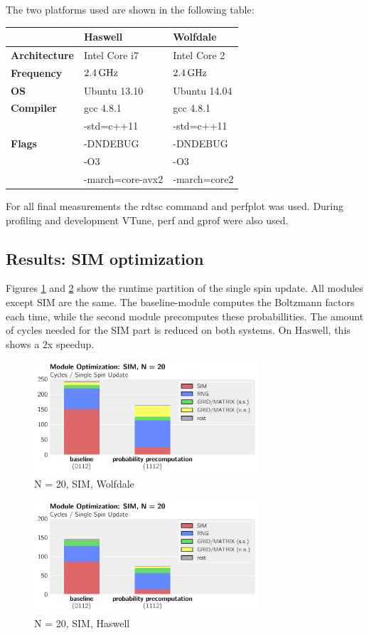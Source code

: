 \documentclass[letterpaper]{article}
\begin{document}
The two platforms used are shown in the following table:\newline
\begin{table}[h]
\begin{tabular}{l|l|l}
 & \textbf{Haswell} & \textbf{Wolfdale}\\\hline\hline
\textbf{Architecture} & Intel Core i7 & Intel Core 2\\\hline
\textbf{Frequency} & $\unit[2.4]{GHz}$ & $\unit[2.4]{GHz}$\\\hline
\textbf{OS} & Ubuntu 13.10 & Ubuntu 14.04\\\hline
\textbf{Compiler} & gcc 4.8.1 & gcc 4.8.1\\\hline
 & -std=c++11  & -std=c++11  \\
\textbf{Flags}& -DNDEBUG & -DNDEBUG \\
& -O3  &  -O3 \\
& -march=core-avx2 & -march=core2 \\
\end{tabular}\newline
\end{table}
For all final measurements the rdtsc command and perfplot \cite{PERFPLOT} was
used. During profiling and development VTune, perf and gprof were
also used.
\subsection{Results: SIM optimization}
Figures \ref{SIM:Wolf:20} and \ref{SIM:Has:20} show the runtime partition of the single spin update. All modules except SIM are the same. The baseline-module computes the Boltzmann factors each time, while the second module precomputes these probabillities. The amount of cycles needed for the SIM part is reduced on both systems. On Haswell, this shows a $2$x speedup.
	\begin{figure}[h]\centering
	  \includegraphics[width = 8.36cm]{plots/msk_20_2.pdf}
	  \caption{N = 20, SIM, Wolfdale}
	  \label{SIM:Wolf:20}
	\end{figure}
	\begin{figure}[h]\centering
	  \includegraphics[width = 8.36cm]{plots/dg_20_2.pdf}
	  \caption{N = 20, SIM, Haswell}
	  \label{SIM:Has:20}
	\end{figure}
\end{document}
